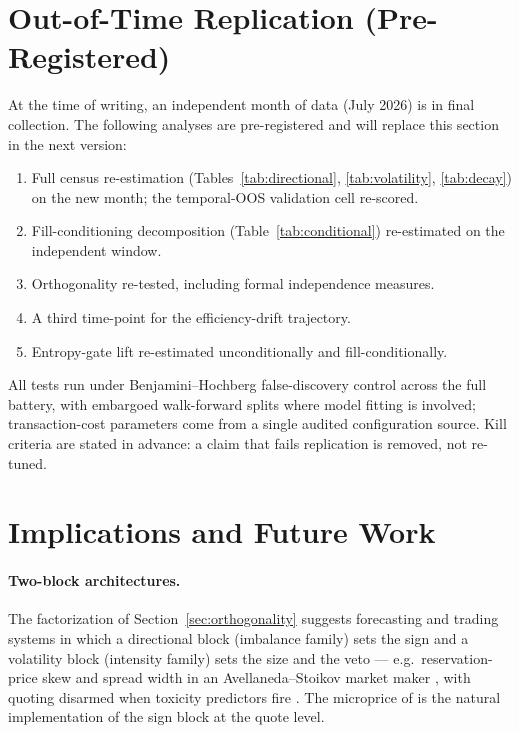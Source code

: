 \documentclass[11pt,a4paper]{article}
\theoremstyle{definition}
\theoremstyle{plain}
\begin{document}
\section{Out-of-Time Replication (Pre-Registered)}
\label{sec:replication}

At the time of writing, an independent month of data (July 2026) is in
final collection. The following analyses are pre-registered and will
replace this section in the next version:

\begin{enumerate}
\item Full census re-estimation (Tables~\ref{tab:directional},
\ref{tab:volatility}, \ref{tab:decay}) on the new month; the
temporal-OOS validation cell re-scored.
\item Fill-conditioning decomposition (Table~\ref{tab:conditional})
re-estimated on the independent window.
\item Orthogonality re-tested, including formal independence measures.
\item A third time-point for the efficiency-drift trajectory.
\item Entropy-gate lift re-estimated unconditionally and
fill-conditionally.
\end{enumerate}

All tests run under Benjamini--Hochberg false-discovery control across
the full battery, with embargoed walk-forward splits where model
fitting is involved; transaction-cost parameters come from a single
audited configuration source. Kill criteria are stated in advance: a
claim that fails replication is removed, not re-tuned.

\section{Implications and Future Work}\label{sec:implications}

\paragraph{Two-block architectures.} The factorization of
Section~\ref{sec:orthogonality} suggests forecasting and trading
systems in which a directional block (imbalance family) sets the sign
and a volatility block (intensity family) sets the size and the veto
--- e.g.\ reservation-price skew and spread width in an
Avellaneda--Stoikov market maker \citep{avellaneda2008,gueant2013},
with quoting disarmed when toxicity predictors fire
\citep{cartea2018}. The microprice of \citet{stoikov2018} is the
natural implementation of the sign block at the quote level.
\end{document}
